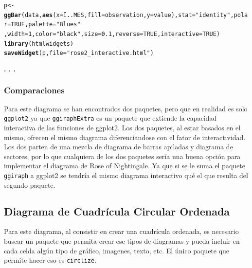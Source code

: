 \documentclass{article}\usepackage[]{graphicx}\usepackage[]{color}
\makeatletter
\newcommand{\hlnum}[1]{\textcolor[rgb]{0.686,0.059,0.569}{#1}}%
\newcommand{\hlstr}[1]{\textcolor[rgb]{0.192,0.494,0.8}{#1}}%
\newcommand{\hlstd}[1]{\textcolor[rgb]{0.345,0.345,0.345}{#1}}%
\newcommand{\hlkwb}[1]{\textcolor[rgb]{0.69,0.353,0.396}{#1}}%
\newcommand{\hlkwc}[1]{\textcolor[rgb]{0.333,0.667,0.333}{#1}}%
\newcommand{\hlkwd}[1]{\textcolor[rgb]{0.737,0.353,0.396}{\textbf{#1}}}%
\newenvironment{kframe}{%
 \def\at@end@of@kframe{}%
 \ifinner\ifhmode%
  \def\at@end@of@kframe{\end{minipage}}%
  \begin{minipage}{\columnwidth}%
 \fi\fi%
 \def\FrameCommand##1{\hskip\@totalleftmargin \hskip-\fboxsep
 \colorbox{shadecolor}{##1}\hskip-\fboxsep
     \hskip-\linewidth \hskip-\@totalleftmargin \hskip\columnwidth}%
 \MakeFramed {\advance\hsize-\width
   \@totalleftmargin\z@ \linewidth\hsize
   \@setminipage}}%
 {\par\unskip\endMakeFramed%
 \at@end@of@kframe}
\newenvironment{knitrout}{}{} %
\makeatother
\begin{document}
\begin{knitrout}
\begin{kframe}\begin{alltt}
\hlstd{p} \hlkwb{<-} \hlkwd{ggBar}\hlstd{(data,} \hlkwd{aes}\hlstd{(}\hlkwc{x}\hlstd{=ï..MES,}\hlkwc{fill}\hlstd{=observation,}\hlkwc{y}\hlstd{=value),}\hlkwc{stat}\hlstd{=}\hlstr{"identity"}\hlstd{,}\hlkwc{polar}\hlstd{=}\hlnum{TRUE}\hlstd{,}\hlkwc{palette}\hlstd{=}\hlstr{"Blues"}
      \hlstd{,}\hlkwc{width}\hlstd{=}\hlnum{1}\hlstd{,} \hlkwc{color}\hlstd{=}\hlstr{"black"}\hlstd{,}\hlkwc{size}\hlstd{=}\hlnum{0.1}\hlstd{,}\hlkwc{reverse}\hlstd{=}\hlnum{TRUE}\hlstd{,}\hlkwc{interactive}\hlstd{=}\hlnum{TRUE}\hlstd{)}
\hlkwd{library}\hlstd{(htmlwidgets)}
\hlkwd{saveWidget}\hlstd{(p,} \hlkwc{file} \hlstd{=} \hlstr{"rose2_interactive.html"}\hlstd{)}
\end{alltt}
\end{kframe}
\end{knitrout}
\begin{center}
\textbf{. . .}
\end{center}
\subsubsection{Comparaciones}
Para este diagrama se han encontrados dos paquetes, pero que en realidad es solo \texttt{ggplot2} ya que \texttt{ggiraphExtra} es un paquete que extiende la capacidad interactiva de las funciones de ggplot2. Los dos paquetes, al estar basados en el mismo, ofrecen el mismo diagrama diferenciandose con el fator de interactividad. Los dos parten de una mezcla de diagrama de barras apiladas y diagrama de sectores, por lo que cualquiera de los dos paquetes ser\'ia una buena opci\'on para implementar el diagrama de Rose of Nightingale. Ya que si se le suma el paquete \texttt{ggiraph} a ggplot2 se tendr\'ia el mismo diagrama interactivo qu\'e el que resulta del segundo paquete.
\clearpage
\subsection{Diagrama de Cuadr\'icula Circular Ordenada}\label{ssec:ord}
Para este diagrama, al consistir en crear una cuadr\'icula ordenada, es necesario buscar un paquete que permita crear ese tipos de diagramas y pueda incluir en cada celda alg\'un tipo de gr\'afico, imagenes, texto, etc. El \'unico paquete que permite hacer eso es \texttt{circlize}.
\end{document}
